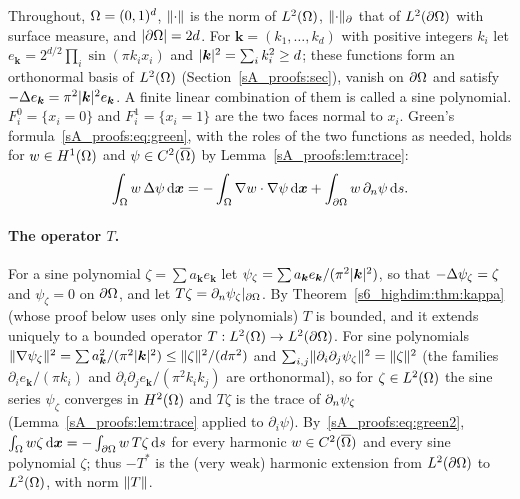 Throughout, $\Omega=(0,1)^d$, $\lVert \cdot\rVert$ is the norm of $L^2(\Omega)$, $\lVert \cdot\rVert_{\partial}$ that of
$L^2(\partial\Omega)$ with surface measure, and $|\partial\Omega|=2d$. For $\boldsymbol k=(k_1,\dots,k_d)$ with positive
integers $k_i$ let $e_{\boldsymbol k}=2^{d/2}\prod_i\sin(\pi k_ix_i)$ and
$\lvert \boldsymbol k\rvert^2=\sum_ik_i^2\ge d$; these functions form an orthonormal basis of $L^2(\Omega)$
(Section~\ref{sA_proofs:sec}), vanish on $\partial\Omega$ and satisfy
$-\Delta e_{\boldsymbol k}=\pi^2\lvert \boldsymbol k\rvert^2e_{\boldsymbol k}$. A finite linear combination
of them is called a sine polynomial. $F_i^0=\{x_i=0\}$ and $F_i^1=\{x_i=1\}$ are the two faces
normal to $x_i$. Green's formula~\eqref{sA_proofs:eq:green}, with the roles of the two functions as
needed, holds for $w\in H^1(\Omega)$ and $\psi\in C^2(\overline{\Omega})$ by
Lemma~\ref{sA_proofs:lem:trace}:
\begin{equation}\label{sA_proofs:eq:green2}
\int_\Omega w\,\Delta\psi\,\mathrm{d}\boldsymbol{x}=-\int_\Omega\nabla w\cdot\nabla\psi\,\mathrm{d}\boldsymbol{x}+\int_{\partial\Omega}w\,\partial_n\psi\,\mathrm{d} s .
\end{equation}

\paragraph{The operator $T$.} For a sine polynomial $\zeta=\sum a_{\boldsymbol k}e_{\boldsymbol k}$
let $\psi_\zeta=\sum a_{\boldsymbol k}e_{\boldsymbol k}/(\pi^2\lvert \boldsymbol k\rvert^2)$, so that
$-\Delta\psi_\zeta=\zeta$ and $\psi_\zeta=0$ on $\partial\Omega$, and let $T\zeta=\partial_n\psi_\zeta|_{\partial\Omega}$. By
Theorem~\ref{s6_highdim:thm:kappa} (whose proof below uses only sine polynomials) $T$ is bounded,
and it extends uniquely to a bounded operator $T:L^2(\Omega)\to L^2(\partial\Omega)$. For sine polynomials
$\lVert \nabla\psi_\zeta\rVert^2=\sum a_{\boldsymbol k}^2/(\pi^2\lvert \boldsymbol k\rvert^2)\le\lVert \zeta\rVert^2/(d\pi^2)$
and $\sum_{i,j}\lVert \partial_i\partial_j\psi_\zeta\rVert^2=\lVert \zeta\rVert^2$ (the families
$\partial_ie_{\boldsymbol k}/(\pi k_i)$ and $\partial_i\partial_je_{\boldsymbol k}/(\pi^2k_ik_j)$ are
orthonormal), so for $\zeta\in L^2(\Omega)$ the sine series $\psi_\zeta$ converges in $H^2(\Omega)$ and
$T\zeta$ is the trace of $\partial_n\psi_\zeta$ (Lemma~\ref{sA_proofs:lem:trace} applied to
$\partial_i\psi$). By~\eqref{sA_proofs:eq:green2}, $\int_\Omega w\zeta\,\mathrm{d}\boldsymbol{x}=-\int_{\partial\Omega}w\,T\zeta\,\mathrm{d} s$
for every harmonic $w\in C^2(\overline{\Omega})$ and every sine polynomial $\zeta$; thus $-T^*$ is the
(very weak) harmonic extension from $L^2(\partial\Omega)$ to $L^2(\Omega)$, with norm $\lVert T\rVert$.

